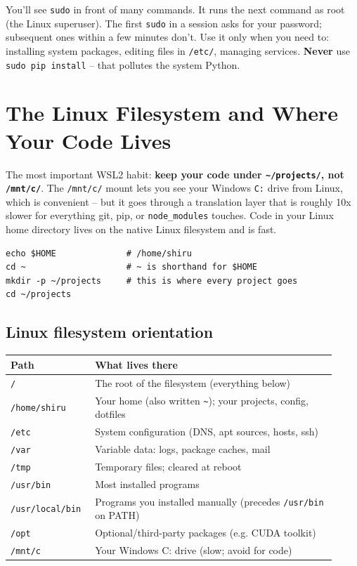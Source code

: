 \documentclass[11pt,a4paper]{article}
\begin{document}
You'll see \texttt{sudo} in front of many commands. It runs the next
command as root (the Linux superuser). The first \texttt{sudo} in a
session asks for your password; subsequent ones within a few minutes
don't. Use it only when you need to: installing system packages,
editing files in \texttt{/etc/}, managing services. \textbf{Never} use
\texttt{sudo pip install} -- that pollutes the system Python.

\section{The Linux Filesystem and Where Your Code Lives}

The most important WSL2 habit: \textbf{keep your code under
\texttt{\textasciitilde{}/projects/}, not \texttt{/mnt/c/}}. The
\texttt{/mnt/c/} mount lets you see your Windows \texttt{C:} drive
from Linux, which is convenient -- but it goes through a translation
layer that is roughly 10x slower for everything git, pip, or
\texttt{node\_modules} touches. Code in your Linux home directory
lives on the native Linux filesystem and is fast.

\begin{lstlisting}[style=bashstyle]
echo $HOME              # /home/shiru
cd ~                    # ~ is shorthand for $HOME
mkdir -p ~/projects     # this is where every project goes
cd ~/projects
\end{lstlisting}

\subsection*{Linux filesystem orientation}

\begin{center}
\begin{tabular}{p{0.22\linewidth} p{0.70\linewidth}}
\toprule
\textbf{Path} & \textbf{What lives there} \\
\midrule
\texttt{/}              & The root of the filesystem (everything below) \\
\texttt{/home/shiru}    & Your home (also written \texttt{\textasciitilde{}}); your projects, config, dotfiles \\
\texttt{/etc}           & System configuration (DNS, apt sources, hosts, ssh) \\
\texttt{/var}           & Variable data: logs, package caches, mail \\
\texttt{/tmp}           & Temporary files; cleared at reboot \\
\texttt{/usr/bin}       & Most installed programs \\
\texttt{/usr/local/bin} & Programs you installed manually (precedes \texttt{/usr/bin} on PATH) \\
\texttt{/opt}           & Optional/third-party packages (e.g. CUDA toolkit) \\
\texttt{/mnt/c}         & Your Windows C: drive (slow; avoid for code) \\
\bottomrule
\end{tabular}
\end{center}
\end{document}
